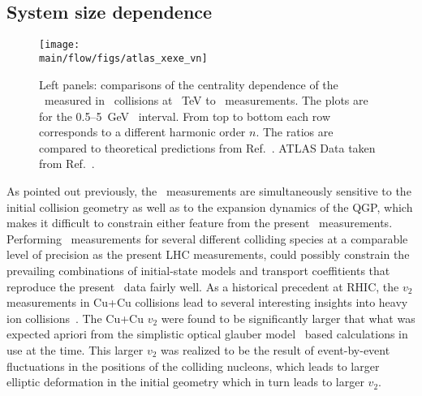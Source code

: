 \subsection{System size dependence}
\label{sec:flow_sizedep}

\begin{figure}[!ht]
\begin{center}
\texttt{[image: \\main/flow/figs/atlas\_xexe\_vn]}
\caption{
Left panels: comparisons of the centrality dependence of the \vn\ measured 
  in \pbpb\ collisions at ~TeV to \xexe\ measurements. 
The plots are for the 0.5--5~GeV \pT\ interval. 
From top to bottom each row corresponds to a different harmonic order $n$.
The ratios are compared to theoretical predictions from Ref.~\cite{Giacalone:2017dud}.
ATLAS Data taken from Ref.~\cite{ATLAS-CONF-2018-011}.
}
\label{fig:atlas_xexe_vn}
\end{center}
\end{figure}

As pointed out previously, the \vn\ measurements are simultaneously
  sensitive to the initial collision geometry as well as to the 
  expansion dynamics of the QGP, which makes it difficult to 
  constrain either feature from the present \vn\ measurements.
Performing \vn\ measurements for several different colliding species
  at a comparable level of precision as the present LHC measurements,  
  could possibly constrain the prevailing combinations of initial-state 
  models and transport coeffitients that reproduce the present \vn\ data 
  fairly well.
As a historical precedent at RHIC, the $v_2$ measurements in Cu+Cu 
  collisions lead to several interesting insights into heavy ion 
  collisions~\cite{RHIC_CU_CU}.
The Cu+Cu $v_2$ were found to be significantly larger that what was 
  expected apriori from the simplistic optical glauber model~\cite{OPTICAL_GLAUBER}
  based calculations in use at the time.
This larger $v_2$ was realized to be the result of event-by-event fluctuations
  in the positions of the colliding nucleons, which leads to larger
  elliptic deformation in the initial geometry which in turn leads 
  to larger $v_2$.


